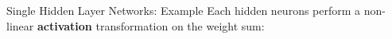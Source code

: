 
\begin{frame} {Single Hidden Layer Networks: Example}
Each hidden neurons perform a non-linear \textbf{activation} transformation on the weight sum:
\begin{figure}
\centering
{}
\end{figure}
\end{frame}

